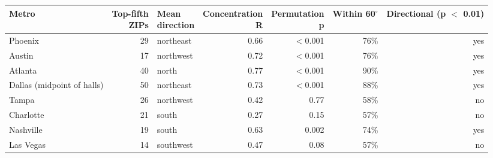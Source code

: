 \footnotesize\setlength{\tabcolsep}{4pt}
\begin{tabular}{lrlrrrr}
\toprule
Metro & \shortstack[r]{Top-fifth\\ZIPs} & \shortstack[r]{Mean\\direction} & \shortstack[r]{Concentration\\R} & \shortstack[r]{Permutation\\p} & \shortstack[r]{Within\\60$^\circ$} & \shortstack[r]{Directional\\(p $<$ 0.01)} \\
\midrule
Phoenix & 29 & northeast & 0.66 & $<$0.001 & 76\% & yes \\
Austin & 17 & northwest & 0.72 & $<$0.001 & 76\% & yes \\
Atlanta & 40 & north & 0.77 & $<$0.001 & 90\% & yes \\
Dallas (midpoint of halls) & 50 & northeast & 0.73 & $<$0.001 & 88\% & yes \\
Tampa & 26 & northwest & 0.42 & 0.77 & 58\% & no \\
Charlotte & 21 & south & 0.27 & 0.15 & 57\% & no \\
Nashville & 19 & south & 0.63 & 0.002 & 74\% & yes \\
Las Vegas & 14 & southwest & 0.47 & 0.08 & 57\% & no \\
\bottomrule
\end{tabular}
